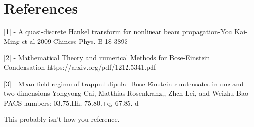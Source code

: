 \documentclass[12pt]{article}
\begin{document}
\section{References}
[1] - A quasi-discrete Hankel transform for nonlinear beam propagation-You Kai-Ming et al 2009 Chinese Phys. B 18 3893

[2] - Mathematical Theory and numerical Methods for Bose-Einstein Condensation-https://arxiv.org/pdf/1212.5341.pdf

[3] - Mean-field regime of trapped dipolar Bose-Einstein condensates in one and two dimensions-Yongyong Cai, Matthias Rosenkranz,, Zhen Lei, and Weizhu Bao-PACS numbers: 03.75.Hh, 75.80.+q, 67.85.-d 
 

This probably isn't how you reference.
\end{document}
